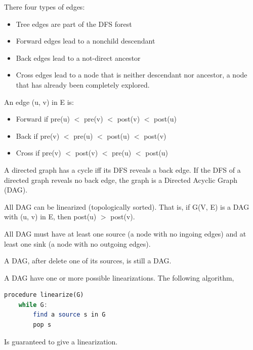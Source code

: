 \begin{definition}
There four types of edges:
\begin{itemize}
	\item Tree edges are part of the DFS forest
	\item Forward edges lead to a nonchild descendant
	\item Back edges lead to a not-direct ancestor
	\item Cross edges lead to a node that is neither descendant nor ancestor, a node that has already been completely explored.
\end{itemize}
An edge (u, v) in E is:
\begin{itemize}
	\item Forward if pre(u) $<$ pre(v) $<$ post(v) $<$ post(u)
	\item Back if pre(v) $<$ pre(u) $<$ post(u) $<$ post(v)
	\item Cross if pre(v) $<$ post(v) $<$ pre(u) $<$ post(u)
\end{itemize}
\end{definition}

\begin{definition}
	A directed graph has a cycle iff its DFS reveals a back edge. If the DFS of a directed graph reveals no back edge, the graph is a Directed Acyclic Graph (DAG).
\end{definition}

\begin{theorem}
	All DAG can be linearized (topologically sorted). That is, if G(V, E) is a DAG with (u, v) in E, then post(u) $>$ post(v).
\end{theorem}

\begin{theorem}
	All DAG must have at least one source (a node with no ingoing edges) and at least one sink (a node with no outgoing edges). 
\end{theorem}

\begin{theorem}
	A DAG, after delete one of its sources, is still a DAG.
\end{theorem}

\begin{theorem}
	A DAG have one or more possible linearizations. The following algorithm,
\begin{lstlisting}[mathescape=true, language=Octave]
procedure linearize(G)
	while G:
		find a source s in G
		pop s
\end{lstlisting}
Is guaranteed to give a linearization.
\end{theorem}

